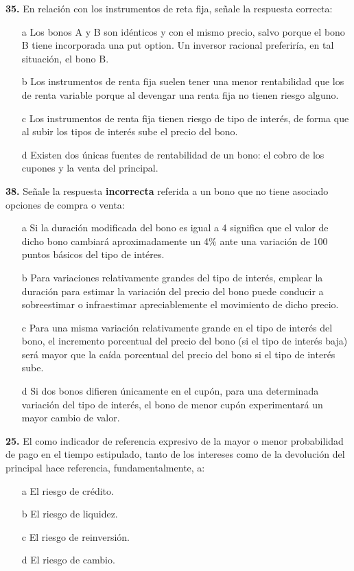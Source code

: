 \documentclass{nuevotema}
\begin{document}
\textbf{35.} En relación con los instrumentos de reta fija, señale la respuesta correcta:
\begin{enumerate}
	\item[a] Los bonos A y B son idénticos y con el mismo precio, salvo porque el bono B tiene incorporada una put option. Un inversor racional preferiría, en tal situación, el bono B.
	\item[b] Los instrumentos de renta fija suelen tener una menor rentabilidad que los de renta variable porque al devengar una renta fija no tienen riesgo alguno.
	\item[c] Los instrumentos de renta fija tienen riesgo de tipo de interés, de forma que al subir los tipos de interés sube el precio del bono.
	\item[d] Existen dos únicas fuentes de rentabilidad de un bono: el cobro de los cupones y la venta del principal.
\end{enumerate}

\textbf{38.}  Señale la respuesta \textbf{incorrecta} referida a un bono que no tiene asociado opciones de compra o venta:
\begin{enumerate}
	\item[a] Si la duración modificada del bono es igual a 4 significa que el valor de dicho bono cambiará aproximadamente un 4\% ante una variación de 100 puntos básicos del tipo de intéres.
	\item[b] Para variaciones relativamente grandes del tipo de interés, emplear la duración para estimar la variación del precio del bono puede conducir a sobreestimar o infraestimar apreciablemente el movimiento de dicho precio.
	\item[c] Para una misma variación relativamente grande en el tipo de interés del bono, el incremento porcentual del precio del bono (si el tipo de interés baja) será mayor que la caída porcentual del precio del bono si el tipo de interés sube.
	\item[d] Si dos bonos difieren únicamente en el cupón, para una determinada variación del tipo de interés, el bono de menor cupón experimentará un mayor cambio de valor.
\end{enumerate}

\textbf{25.} El  como indicador de referencia expresivo de la mayor o menor probabilidad de pago en el tiempo estipulado, tanto de los intereses como de la devolución del principal hace referencia, fundamentalmente, a:
\begin{enumerate}
	\item[a] El riesgo de crédito.
	\item[b] El riesgo de liquidez.
	\item[c] El riesgo de reinversión.
	\item[d] El riesgo de cambio.
\end{enumerate}
\end{document}
